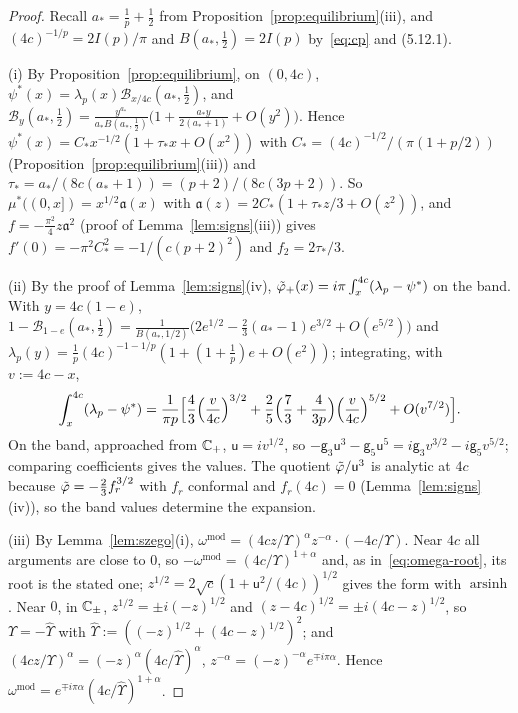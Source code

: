 \begin{proof}
Recall $a_*=\frac1p+\frac12$ from Proposition~\ref{prop:equilibrium}(iii), and $(4c)^{-1/p}=2I(p)/\pi$ and $B(a_*,\frac12)=2I(p)$ by~\eqref{eq:cp} and (5.12.1).

(i) By Proposition~\ref{prop:equilibrium}, on $(0,4c)$, $\psi^*(x)=\lambda_p(x)\mathcal B_{x/4c}(a_*,\frac12)$, and
$\mathcal B_y(a_*,\frac12)=\frac{y^{a_*}}{a_*B(a_*,\frac12)}\bigl(1+\frac{a_*y}{2(a_*+1)}+O(y^2)\bigr)$. Hence
$\psi^*(x)=C_*x^{-1/2}(1+\tau_*x+O(x^2))$ with $C_*=(4c)^{-1/2}/(\pi(1+p/2))$ (Proposition~\ref{prop:equilibrium}(iii)) and
$\tau_*=a_*/(8c(a_*+1))=(p+2)/(8c(3p+2))$. So $\mu^*((0,x])=x^{1/2}\mathfrak a(x)$ with $\mathfrak a(z)=2C_*(1+\tau_*z/3+O(z^2))$,
and $f=-\frac{\pi^2}4z\mathfrak a^2$ (proof of Lemma~\ref{lem:signs}(iii)) gives $f'(0)=-\pi^2C_*^2=-1/(c(p+2)^2)$ and
$f_2=2\tau_*/3$.

(ii) By the proof of Lemma~\ref{lem:signs}(iv), $\tilde\varphi_+(x)=i\pi\int_x^{4c}(\lambda_p-\psi^*)$ on the band. With
$y=4c(1-e)$, $1-\mathcal B_{1-e}(a_*,\frac12)=\frac1{B(a_*,1/2)}\bigl(2e^{1/2}-\frac23(a_*-1)e^{3/2}+O(e^{5/2})\bigr)$ and
$\lambda_p(y)=\frac1p(4c)^{-1-1/p}(1+(1+\frac1p)e+O(e^2))$; integrating, with $v:=4c-x$,
\[
  \int_x^{4c}(\lambda_p-\psi^*)=\frac1{\pi p}\Bigl[\frac43\Bigl(\frac v{4c}\Bigr)^{3/2}+\frac25\Bigl(\frac73+\frac4{3p}\Bigr)\Bigl(\frac v{4c}\Bigr)^{5/2}
  +O(v^{7/2})\Bigr].
\]
On the band, approached from $\mathbb{C}_+$, $\mathsf u=iv^{1/2}$, so $-\mathsf g_3\mathsf u^3-\mathsf g_5\mathsf u^5=i\mathsf g_3v^{3/2}-i\mathsf g_5v^{5/2}$;
comparing coefficients gives the values. The quotient $\tilde\varphi/\mathsf u^3$ is analytic at $4c$ because
$\tilde\varphi=-\frac23f_r^{3/2}$ with $f_r$ conformal and $f_r(4c)=0$ (Lemma~\ref{lem:signs}(iv)), so the band values determine
the expansion.

(iii) By Lemma~\ref{lem:szego}(i), $\omega^{\mathrm{mod}}=(4cz/\Upsilon)^\alpha z^{-\alpha}\cdot(-4c/\Upsilon)$. Near $4c$ all
arguments are close to $0$, so $-\omega^{\mathrm{mod}}=(4c/\Upsilon)^{1+\alpha}$ and, as in~\eqref{eq:omega-root}, its root is the
stated one; $z^{1/2}=2\sqrt c(1+\mathsf u^2/(4c))^{1/2}$ gives the form with $\operatorname{arsinh}$. Near $0$, in $\mathbb{C}_\pm$,
$z^{1/2}=\pm i(-z)^{1/2}$ and $(z-4c)^{1/2}=\pm i(4c-z)^{1/2}$, so $\Upsilon=-\hat\Upsilon$ with
$\hat\Upsilon:=((-z)^{1/2}+(4c-z)^{1/2})^2$; and $(4cz/\Upsilon)^\alpha=(-z)^\alpha(4c/\hat\Upsilon)^\alpha$, $z^{-\alpha}=(-z)^{-\alpha}e^{\mp
i\pi\alpha}$. Hence $\omega^{\mathrm{mod}}=e^{\mp i\pi\alpha}(4c/\hat\Upsilon)^{1+\alpha}$.
\end{proof}

